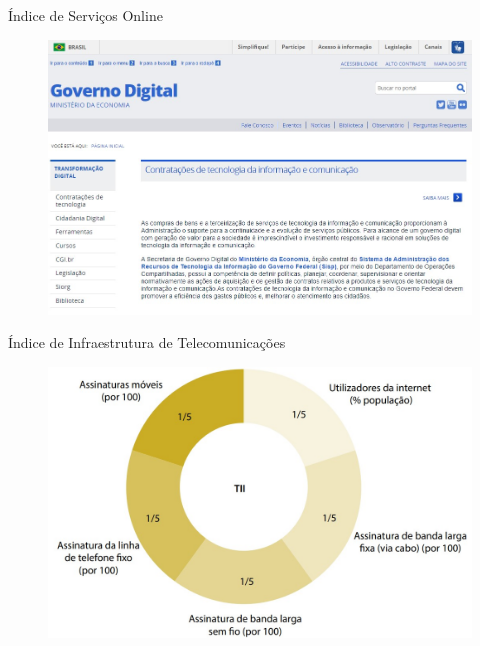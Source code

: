 \documentclass{Alexandre}
\begin{document}
\begin{frame}{Índice de Serviços Online}

    \begin{figure}
        \includegraphics[scale = 0.38]{Figuras/GovernoDigital.jpg}
    \end{figure}

\end{frame}


\begin{frame}{Índice de Infraestrutura de Telecomunicações}

    \begin{figure}
        \includegraphics[scale = 0.30]{Figuras/TII.jpg}
    \end{figure}

\end{frame}
\end{document}
